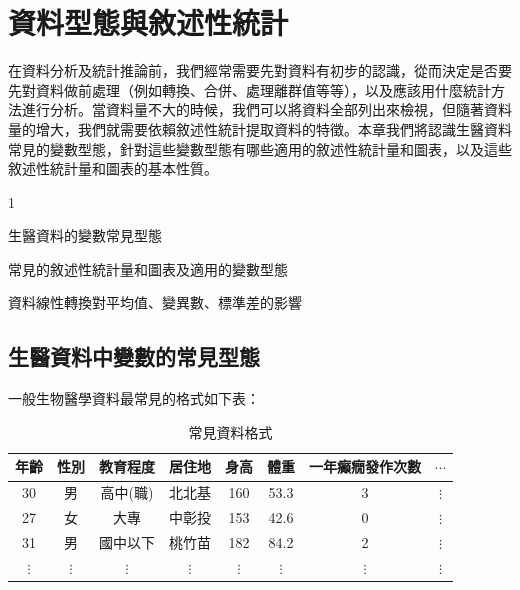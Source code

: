 \chapter{資料型態與敘述性統計}
    在資料分析及統計推論前，我們經常需要先對資料有初步的認識，從而決定是否要先對資料做前處理（例如轉換、合併、處理離群值等等），以及應該用什麼統計方法進行分析。當資料量不大的時候，我們可以將資料全部列出來檢視，但隨著資料量的增大，我們就需要依賴敘述性統計提取資料的特徵。本章我們將認識生醫資料常見的變數型態，針對這些變數型態有哪些適用的敘述性統計量和圖表，以及這些敘述性統計量和圖表的基本性質。
    
    \begin{introduction}{1}
        \item 生醫資料的變數常見型態
        \item 常見的敘述性統計量和圖表及適用的變數型態
        \item 資料線性轉換對平均值、變異數、標準差的影響
    \end{introduction}

\section{生醫資料中變數的常見型態}

    一般生物醫學資料最常見的格式如下表：

    \begin{table}[htbp]
        \begin{center}
            \begin{tabular}{cccccccc}
                \toprule
                年齡 & 性別 & 教育程度 & 居住地 & 身高 & 體重 & 一年癲癇發作次數 & $\cdots$\\
                \hline
                30 & 男 & 高中(職) & 北北基 & 160 & 53.3 & 3 & $\vdots$ \\
                27 & 女 & 大專 & 中彰投 & 153 & 42.6 & 0 & $\vdots$ \\
                31 & 男 & 國中以下 & 桃竹苗 & 182 & 84.2 & 2 & $\vdots$ \\
                $\vdots$ & $\vdots$ & $\vdots$ & $\vdots$ & $\vdots$ & $\vdots$ & $\vdots$ & $\vdots$ \\
                \bottomrule
            \end{tabular}
            \caption{常見資料格式\label{tab:data}}
        \end{center}
    \end{table}
        
